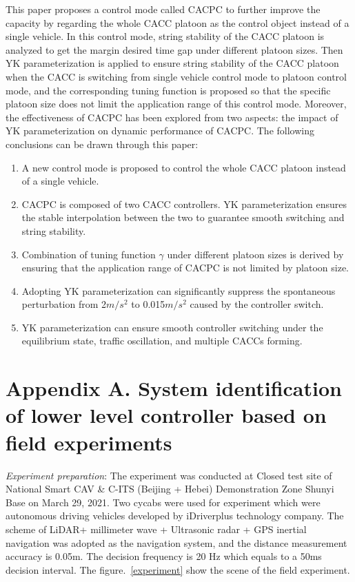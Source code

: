 \documentclass[a4paper,fleqn]{cas-sc}
\begin{document}
This paper proposes a control mode called CACPC to further improve the capacity by regarding the whole CACC platoon as the control object instead of a single vehicle. In this control mode, string stability of the CACC platoon is analyzed to get the margin desired time gap under different platoon sizes. Then YK parameterization is applied to ensure string stability of the CACC platoon when the CACC is switching from single vehicle control mode to platoon control mode, and the corresponding tuning function is proposed so that the specific platoon size does not limit the application range of this control mode. Moreover, the effectiveness of CACPC has been explored from two aspects: the impact of YK parameterization on dynamic performance of CACPC. The following conclusions can be drawn through this paper:
\begin{enumerate}
  \item A new control mode is proposed to control the whole CACC platoon instead of a single vehicle.
  \item CACPC is composed of two CACC controllers. YK parameterization ensures the stable interpolation between the two to guarantee smooth switching and string stability.
  \item Combination of tuning function $\gamma$ under different platoon sizes is derived by ensuring that the application range of CACPC is not limited by platoon size.
  \item Adopting YK parameterization can significantly suppress the spontaneous perturbation from 2$m/s^2$ to 0.015$m/s^2$ caused by the controller switch.
  \item YK parameterization can ensure smooth controller switching under the equilibrium state, traffic oscillation, and multiple CACCs forming.
\end{enumerate}



\appendix
\section*{Appendix A. System identification of lower level controller based on field experiments}
\label{AppendixA}

\textit{Experiment preparation}: The experiment was conducted at Closed test site of National Smart CAV \& C-ITS (Beijing + Hebei) Demonstration Zone Shunyi Base on March 29, 2021. Two cycabs were used for experiment which were autonomous driving vehicles developed by iDriverplus technology company. The scheme of LiDAR+ millimeter wave + Ultrasonic radar + GPS inertial navigation was adopted as the navigation system, and the distance measurement accuracy is 0.05m. The decision frequency is 20 Hz which equals to a 50ms decision interval. The figure.~\ref{experiment} show the scene of the field experiment.
\end{document}
